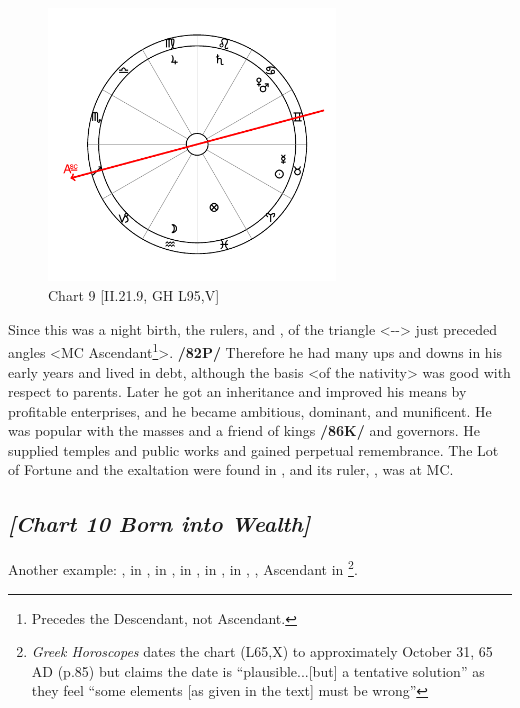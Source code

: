 \clearpage
\begin{figure}
\centering
\vspace{-20pt}
\includegraphics[width=0.68\textwidth]{charts/2_21_9}
\caption{Chart 9 [II.21.9, GH L95,V]}
\label{fig:chart09}
\end{figure}

Since this was a night birth, the rulers, \Saturn\xspace and \Mercury, of the triangle <\Gemini-\Libra-\Aquarius> just preceded angles <MC Ascendant\footnote{Precedes the Descendant, not Ascendant.}>. \textbf{/82P/} Therefore he had many ups and downs in his early years and lived in debt, although the basis <of the nativity> was good
with respect to parents. Later he got an inheritance and improved his means by profitable enterprises, and he became ambitious, dominant, and munificent. He was popular with the masses and a friend of kings \textbf{/86K/} and governors. He supplied temples and public works and gained perpetual remembrance. The Lot of Fortune and the exaltation were found in \Pisces, and its ruler, \Jupiter, was at MC.
\newpage
\subsection*{\textit{[Chart 10 Born into Wealth]}}

Another example: \Sun, \Mercury\xspace in \Scorpio, \Moon\xspace in \Aries, \Saturn\xspace in \Virgo, \Jupiter\xspace in \Pisces, \Mars\xspace in \Leo, \Venus, Ascendant in \Sagittarius
\footnote{\textit{Greek Horoscopes} dates the chart (L65,X) to approximately October 31, 65 AD (p.85) but claims the date is ``plausible...[but] a tentative solution'' as they feel ``some elements [as given in the text] must be wrong''}.


